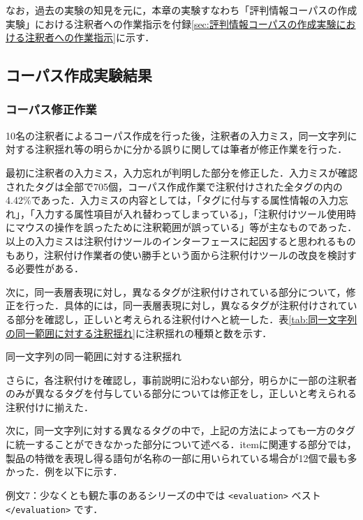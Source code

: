 \documentclass[japanese]{jnlp_1.4}
\begin{document}
なお，過去の実験の知見を元に，本章の実験すなわち「評判情報コーパスの作成実験」における注釈者への作業指示を付録\ref{sec:評判情報コーパスの作成実験における注釈者への作業指示}に示す．


\subsection{コーパス作成実験結果}
\label{sec:コーパス作成実験結果}

\subsubsection{コーパス修正作業}
\label{sec:コーパス修正作業}

10名の注釈者によるコーパス作成を行った後，注釈者の入力ミス，同一文字列に対する注釈揺れ等の明らかに分かる誤りに関しては筆者が修正作業を行った．

最初に注釈者の入力ミス，入力忘れが判明した部分を修正した．入力ミスが確認されたタグは全部で705個，コーパス作成作業で注釈付けされた全タグの内の4.42\%であった．入力ミスの内容としては，「タグに付与する属性情報の入力忘れ」，「入力する属性項目が入れ替わってしまっている」，「注釈付けツール使用時にマウスの操作を誤ったために注釈範囲が誤っている」等が主なものであった．
以上の入力ミスは注釈付けツールのインターフェースに起因すると思われるものもあり，注釈付け作業者の使い勝手という面から注釈付けツールの改良を検討する必要性がある．

次に，同一表層表現に対し，異なるタグが注釈付けされている部分について，修正を行った．具体的には，同一表層表現に対し，異なるタグが注釈付けされている部分を確認し，正しいと考えられる注釈付けへと統一した．表\ref{tab:同一文字列の同一範囲に対する注釈揺れ}に注釈揺れの種類と数を示す．

\begin{table}[b]
\caption{同一文字列の同一範囲に対する注釈揺れ}
\label{tab:同一文字列の同一範囲に対する注釈揺れ}

\end{table}

さらに，各注釈付けを確認し，事前説明に沿わない部分，明らかに一部の注釈者のみが異なるタグを付与している部分については修正をし，正しいと考えられる注釈付けに揃えた．

次に，同一文字列に対する異なるタグの中で，上記の方法によっても一方のタグに統一することができなかった部分について述べる．itemに関連する部分では，製品の特徴を表現し得る語句が名称の一部に用いられている場合が12個で最も多かった．例を以下に示す．

\vspace*{0.5\baselineskip}
例文7：少なくとも観た事のあるシリーズの中では \verb|<evaluation>| ベスト \verb|</evaluation>| です．
\end{document}
